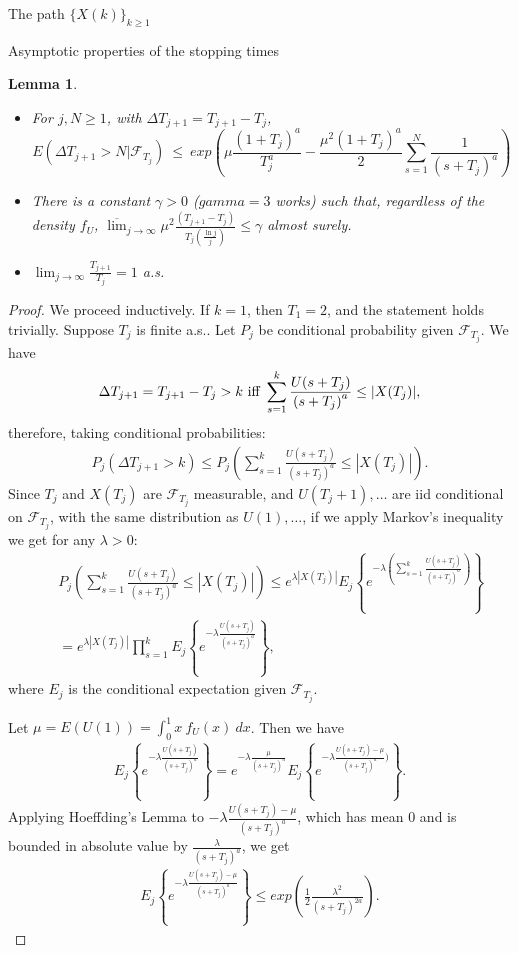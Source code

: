 \documentclass[12pt]{article}
\newtheorem{lemma}[theorem]{Lemma}
\begin{document}
\begin{section}{The path $\{X(k)\}_{k\ge1}$ }
\begin{subsection}{Asymptotic properties of the stopping times}
\begin{lemma}
\begin{itemize}
	\item[ii.] For $j,N \ge 1$, with $\Delta T_{j+1} = T_{j+1} - T_{j}$,
	$$ E\left( \Delta T_{j+1} > N | \mathcal{F}_{T_j}\right) ~\le~
	exp\left( 
	\mu  \frac{(1+T_j)^a}{T_j^a} 
	- \frac{\mu^2 (1+T_j)^a}{2} \sum_{s=1}^{N} \frac{1}{{(s+T_j)}^a}  \right)
	$$
	
	\item[iii.] There is a constant $\gamma > 0$ ($gamma = 3$ works) such that, regardless of the density $f_U$, $\overline{\lim}_{j \rightarrow \infty } \mu^2 
	\frac{(T_{j+1}-T_j)}{ T_j (\frac{\ln j}{j})} \le \gamma $ almost surely.
	\item[iv.] $\lim_{j \rightarrow \infty} \frac{T_{j+1} }{T_j} = 1$ a.s.
\end{itemize}
\end{lemma}

\begin{proof}
 We proceed inductively. If $k=1$, then $T_1=2$, and the statement holds trivially. Suppose $T_{j}$ is finite a.s.. Let $P_{j}$ be conditional probability given $\mathcal{F}_{T_j}$. We have 
 $$
 \Delta T_{j+1} = T_{j+1} - T_{j} > k \text{ iff }\\
 \sum_{s=1}^{k} \frac{U(s+T_j)}{{(s+T_j)}^a} \le |X(T_{j})|,
 $$
 therefore, taking conditional probabilities:
 \begin{align*}
 P_j\left( \Delta T_{j+1} > k \right) \le 
 P_j\left( \sum_{s=1}^{k} \frac{U(s+T_j)}{{(s+T_j)}^a} \le |X(T_{j})| \right).
 \end{align*}
 Since $T_j$ and $X(T_j)$ are $\mathcal{F}_{T_j}$ measurable, and $U(T_j+1),\dots$ are iid conditional on $\mathcal{F}_{T_j}$, with the same distribution as $U(1),\dots$, if we apply Markov's inequality we get for any $\lambda > 0$:
 \begin{align*}
&& P_j\left( \sum_{s=1}^{k} \frac{U(s+T_j)}{{(s+T_j)}^a} \le |X(T_{j})| \right) 
 \le e^{\lambda |X(T_{j})|} 
E_j\left\{ e^{-\lambda (\sum_{s=1}^{k} \frac{U(s+T_j)}{{(s+T_j)}^a} ) }    \right\} \\
&& =  e^{\lambda |X(T_{j})|} 
 \prod_{s=1}^{k}  E_j\left\{ e^{-\lambda \frac{U(s+T_j)}{{(s+T_j)}^a}  }    \right\},
 \end{align*}
 where $E_j$ is the conditional expectation given $\mathcal{F}_{T_j}$.  
 
 Let $\mu = E(U(1)) = \int_{0}^{1} x \ f_U(x) \ dx$. Then we have
 \begin{align*}
 E_j\left\{ e^{-\lambda \frac{U(s+T_j)}{{(s+T_j)}^a} }  \right\} 
  = e^{-\lambda \frac{\mu}{{(s+T_j)}^a} } 
 E_j\left\{ e^{-\lambda \frac{U(s+T_j)-\mu}{{(s+T_j)}^a} ) } \right\}.  
 \end{align*}
Applying Hoeffding's Lemma to $-\lambda \frac{U(s+T_j)-\mu}{{(s+T_j)}^a}$, which has mean $0$ and is bounded in absolute value by $\frac{\lambda}{{(s+T_j)}^a}$, we get
\begin{align*}
E_j\left\{ e^{-\lambda \frac{U(s+T_j)-\mu}{{(s+T_j)}^a} } \right\} 
\le exp\left(  \frac{1}{2} \frac{\lambda^2}{{(s+T_j)}^{2a} }  \right) . 
\end{align*}  


\end{proof}
\end{subsection}
\end{section}
\end{document}
